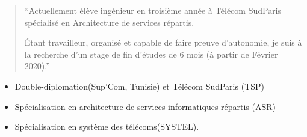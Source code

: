 \documentclass[9pt,a4paper,ragged2e,normalphoto]{altacv}
\begin{document}

\begin{fullwidth}
\makecvheader
\end{fullwidth}


\begin{quote}
``Actuellement élève ingénieur en
troisième année à Télécom SudParis spécialisé en Architecture de services répartis.

Étant travailleur, organisé et capable
de faire preuve d'autonomie, je suis à
la recherche d'un stage de fin d'études
de 6 mois (à partir de Février
2020).''
\end{quote}


\begin{itemize}
\item Double-diplomation(Sup'Com, Tunisie) et Télécom SudParis (TSP)
\item Spécialisation en architecture de services informatiques répartis (ASR)
\end{itemize}
\divider

\begin{itemize}
\item Spécialisation en système des télécoms(SYSTEL).
\end{itemize}
\divider
\end{document}
